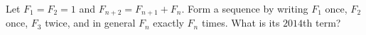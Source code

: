 Let $F_1=F_2=1$ and $F_{n+2}=F_{n+1}+F_n$. Form a sequence by writing $F_1$ once, $F_2$ once, $F_3$ twice, and in general $F_n$ exactly $F_n$ times. What is its $2014$th term?
